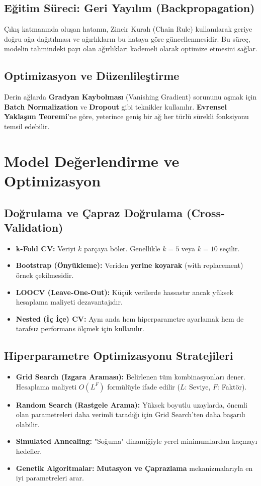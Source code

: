 \documentclass[12pt,a4paper]{article}
\begin{document}
\subsection{Eğitim Süreci: Geri Yayılım (Backpropagation)}
Çıkış katmanında oluşan hatanın, Zincir Kuralı (Chain Rule) kullanılarak geriye doğru ağa dağıtılması ve ağırlıkların bu hataya göre güncellenmesidir. Bu süreç, modelin tahmindeki payı olan ağırlıkları kademeli olarak optimize etmesini sağlar.

\subsection{Optimizasyon ve Düzenlileştirme}
Derin ağlarda \textbf{Gradyan Kaybolması} (Vanishing Gradient) sorununu aşmak için \textbf{Batch Normalization} ve \textbf{Dropout} gibi teknikler kullanılır. \textbf{Evrensel Yaklaşım Teoremi}'ne göre, yeterince geniş bir ağ her türlü sürekli fonksiyonu temsil edebilir.


\newpage
\section{Model Değerlendirme ve Optimizasyon}

\subsection{Doğrulama ve Çapraz Doğrulama (Cross-Validation)}
\begin{itemize}
    \item \textbf{k-Fold CV:} Veriyi $k$ parçaya böler. Genellikle $k=5$ veya $k=10$ seçilir.
    \item \textbf{Bootstrap (Önyükleme):} Veriden \textbf{yerine koyarak} (with replacement) örnek çekilmesidir.
    \item \textbf{LOOCV (Leave-One-Out):} Küçük verilerde hassastır ancak yüksek hesaplama maliyeti dezavantajıdır.
    \item \textbf{Nested (İç İçe) CV:} Aynı anda hem hiperparametre ayarlamak hem de tarafsız performans ölçmek için kullanılır.
\end{itemize}

\subsection{Hiperparametre Optimizasyonu Stratejileri}
\begin{itemize}
    \item \textbf{Grid Search (Izgara Araması):} Belirlenen tüm kombinasyonları dener. Hesaplama maliyeti $O(L^F)$ formülüyle ifade edilir ($L$: Seviye, $F$: Faktör).
    \item \textbf{Random Search (Rastgele Arama):} Yüksek boyutlu uzaylarda, önemli olan parametreleri daha verimli taradığı için Grid Search'ten daha başarılı olabilir.
    \item \textbf{Simulated Annealing:} "Soğuma" dinamiğiyle yerel minimumlardan kaçmayı hedefler.
    \item \textbf{Genetik Algoritmalar:} \textbf{Mutasyon ve Çaprazlama} mekanizmalarıyla en iyi parametreleri arar.
\end{itemize}
\end{document}
